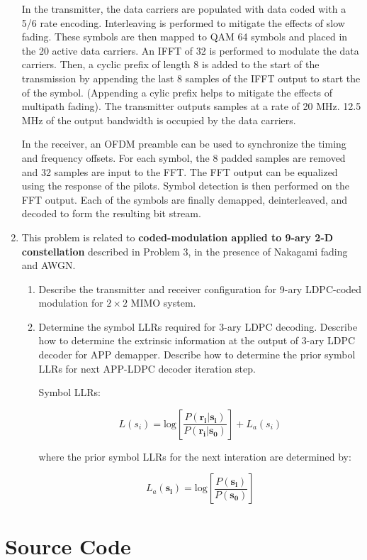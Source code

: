 \documentclass[fleqn]{article}
\begin{document}
\begin{enumerate}
		In the transmitter, the data carriers are populated with data coded with a 5/6 rate encoding. Interleaving is performed to mitigate the effects of slow fading. These symbols are then mapped to QAM 64 symbols and placed in the 20 active data carriers. An IFFT of 32 is performed to modulate the data carriers. Then, a cyclic prefix of length 8 is added to the start of the transmission by appending the last 8 samples of the IFFT output to start the of the symbol. (Appending a cylic prefix helps to mitigate the effects of multipath fading). The transmitter outputs samples at a rate of 20 MHz. 12.5 MHz of the output bandwidth is occupied by the data carriers.
		
		In the receiver, an OFDM preamble can be used to synchronize the timing and frequency offsets. For each symbol, the 8 padded samples are removed and 32 samples are input to the FFT. The FFT output can be equalized using the response of the pilots. Symbol detection is then performed on the FFT output. Each of the symbols are finally demapped, deinterleaved, and decoded to form the resulting bit stream.
		
		\item This problem is related to \textbf{coded-modulation applied to 9-ary 2-D constellation} described in Problem 3, in the presence of Nakagami fading and AWGN.
		
		\begin{enumerate}
			\item Describe the transmitter and receiver configuration for 9-ary LDPC-coded modulation for $2\times 2$ MIMO system.
			
			\item Determine the symbol LLRs required for 3-ary LDPC decoding. Describe how to determine the extrinsic information at the output of 3-ary LDPC decoder for APP demapper. Describe how to determine the prior symbol LLRs for next APP-LDPC decoder iteration step.
			
			Symbol LLRs:
			
			\begin{equation*}
				L(s_i) = \text{log}\left[\frac{P(\mathbf{r_i}|\mathbf{s_i})}{P(\mathbf{r_i}|\mathbf{s_0})}\right] + L_a(s_i)
			\end{equation*}
			
			where the prior symbol LLRs for the next interation are determined by:
			
			\begin{equation*}
				L_a(\mathbf{s_i}) = \text{log}\left[\frac{P(\mathbf{s_i})}{P(\mathbf{s_0})}\right]
			\end{equation*}
		\end{enumerate}
	\end{enumerate}
	
	\pagebreak
	\appendix
	\section{Source Code}
	\label{source_code}
	\lstset{style=Matlab-editor,basicstyle=\ttfamily\footnotesize}
	
	\raggedbottom
\end{document}
